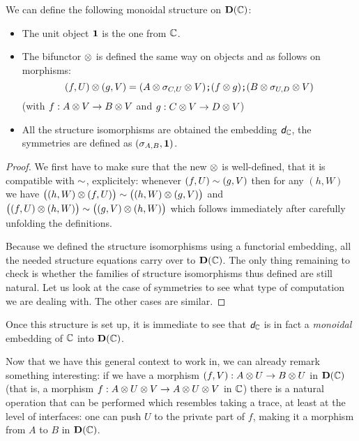 \begin{proposition}
	We can define the following monoidal structure on $\mathbf D(\mathbb{C})$:
	\begin{itemize}
		\item The unit object $\mathbf 1$ is the one from $\mathbb{C}$.
		\item The bifunctor $\otimes$ is defined the same way on objects and as follows on morphisms:
		$$(f,U)\otimes(g,V)=(A\otimes \sigma_{C,U}\otimes V)\textbf{\tt;}(f\otimes g)\textbf{\tt;}(B\otimes \sigma_{U,D}\otimes V)
		$$
		(with $f:A\otimes V\rightarrow B\otimes V$ and $g:C\otimes V\rightarrow D\otimes V$)
		\item All the structure isomorphisms are obtained \via the embedding $\textit{\textsf{d}}_{\mathbb{C}}$, \eg the
		symmetries are defined as $(\sigma_{A,B}, \mathbf 1)$.
	\end{itemize}
\end{proposition}

\begin{proof}
	We first have to make sure that the new $\otimes$ is well-defined, \ie that it is compatible with
	$\sim$, explicitely: whenever $(f,U)\sim(g,V)$ then for any $(h,W)$ we have 
	$\big((h,W)\otimes(f,U)\big)\sim\big((h,W)\otimes(g,V)\big)$ and 
	$\big((f,U)\otimes(h,W)\big)\sim\big((g,V)\otimes(h,W)\big)$ which follows immediately after carefully
	unfolding the definitions.

	Because we defined the structure isomorphisms using a functorial embedding, all the needed
	structure equations carry over to $\mathbf D(\mathbb{C})$. The only thing remaining to check is whether
	the families of structure isomorphisms thus defined are still natural.
	Let us look at the case of symmetries to see what type of computation we are dealing with. The
	other cases are similar.
	
\end{proof}

\begin{remark}
	Once this structure is set up, it is immediate to see that $\textit{\textsf{d}}_{\mathbb{C}}$ is in fact a \emph{monoidal}
	embedding of $\mathbb{C}$ into $\mathbf D(\mathbb{C})$.
\end{remark}


Now that we have this general context to work in, we can already remark something interesting:
if we have a morphism $(f,V):A\otimes U\rightarrow B\otimes U$ in $\mathbf D(\mathbb{C})$ (that is, a morphism
$f:A\otimes U\otimes V\rightarrow A\otimes U\otimes V$ in $\mathbb{C}$) there is a natural operation that can be
performed which resembles taking a trace, at least at the level of interfaces: one can push $U$
to the private part of $f$, making it a morphism from $A$ to $B$ in $\mathbf D(\mathbb{C})$.

